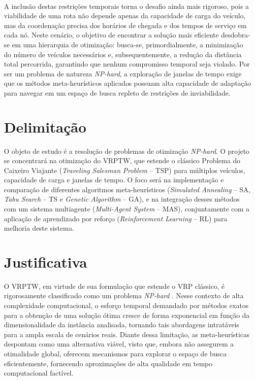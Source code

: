 \paragraph{}A inclusão destas restrições temporais torna o desafio ainda mais rigoroso, pois a viabilidade de uma rota não depende apenas da capacidade de carga do veículo, mas da coordenação precisa dos horários de chegada e dos tempos de serviço em cada nó. Neste cenário, o objetivo de encontrar a solução mais eficiente desdobra-se em uma hierarquia de otimização: busca-se, primordialmente, a minimização do número de veículos necessários e, subsequentemente, a redução da distância total percorrida, garantindo que nenhum compromisso temporal seja violado. Por ser um problema de natureza \textit{NP-hard}, a exploração de janelas de tempo exige que os métodos meta-heurísticos aplicados possuam alta capacidade de adaptação para navegar em um espaço de busca repleto de restrições de inviabilidade.

\section{Delimitação}
\label{sec:delimitacao}

\paragraph{}O objeto de estudo é a resolução de problemas de otimização \textit{NP-hard}. O projeto se concentrará na otimização do VRPTW, que estende o clássico Problema do Caixeiro Viajante (\textit{Traveling Salesman Problem} -- TSP) para múltiplos veículos, capacidade de carga e janelas de tempo. O foco será na implementação e comparação de diferentes algoritmos meta-heurísticos (\textit{Simulated Annealing} -- SA, \textit{Tabu Search} -- TS e \textit{Genetic Algorithm} -- GA), e na integração desses métodos com um sistema multiagente (\textit{Multi-Agent System} -- MAS), conjuntamente com a aplicação de aprendizado por reforço (\textit{Reinforcement Learning} -- RL) para melhoria deste sistema.

\section{Justificativa}
\label{sec:justificativa}

\paragraph{}O VRPTW, em virtude de sua formulação que estende o VRP clássico, é rigorosamente classificado como um problema \textit{NP-hard} \cite{Garey79}. Nesse contexto de alta complexidade computacional, o esforço temporal demandado por métodos exatos para a obtenção de uma solução ótima cresce de forma exponencial em função da dimensionalidade da instância analisada, tornando tais abordagens intratáveis para a ampla escala de cenários reais. Diante dessa limitação, as meta-heurísticas despontam como uma alternativa viável, visto que, embora não assegurem a otimalidade global, oferecem mecanismos para explorar o espaço de busca eficientemente, fornecendo aproximações de alta qualidade em tempo computacional factível.

